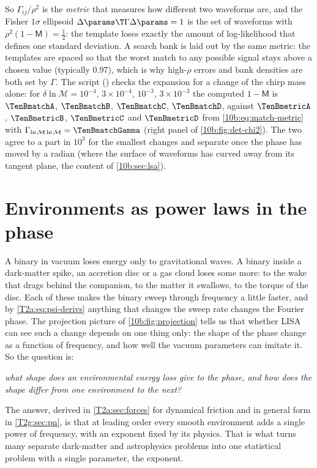 So $\Gamma_{ij}/\rho^2$ is the \emph{metric} that measures how different two waveforms are, and the Fisher
$1\sigma$ ellipsoid $\Delta\params\T\Gamma\Delta\params=1$ is the set of waveforms with $\rho^2(1-\mathsf M)=\tfrac12$: the
template loses exactly the amount of log-likelihood that defines one standard deviation. A search bank is laid out
by the same metric: the templates are spaced so that the worst match to any possible signal stays above a chosen value
(typically $0.97$), which is why high-$\rho$ errors and bank densities are both set by $\Gamma$.
The script () checks the expansion for a change of the chirp mass alone: for
$\delta\ln\mathcal M=10^{-4}$, $3\times10^{-4}$, $10^{-3}$, $3\times10^{-3}$ the computed $1-\mathsf M$ is
$\TenBmatchA$, $\TenBmatchB$, $\TenBmatchC$, $\TenBmatchD$, against $\TenBmetricA$, $\TenBmetricB$, $\TenBmetricC$ and
$\TenBmetricD$ from \eqref{10b:eq:match-metric} with $\Gamma_{\ln\mathcal M\ln\mathcal M}=\TenBmatchGamma$ (right panel of
\cref{10b:fig:det-chi2}). The two agree to a part in $10^{3}$ for the smallest changes and separate once the phase
has moved by a radian (where the surface of waveforms has curved away from its tangent plane, the content of
\cref{10b:sec:lsa}).
\section{Environments as power laws in the phase}
\label{10b:sec:env}

A binary in vacuum loses energy only to gravitational waves. A binary inside a dark-matter spike, an accretion
disc or a gas cloud loses some more: to the wake that drags behind the companion, to the matter it swallows, to the
torque of the disc. Each of these makes the binary sweep through frequency a little faster, and by
\cref{T2a:eq:psi-derivs} anything that changes the sweep rate changes the Fourier phase. The projection picture of
\cref{10b:fig:projection} tells us that whether LISA can see such a change depends on one thing only: the shape of
the phase change as a function of frequency, and how well the vacuum parameters can imitate it. So the question is:
\begin{center}
\emph{what shape does an environmental energy loss give to the phase, and how does the shape differ from one
environment to the next?}
\end{center}
The answer, derived in \cref{T2a:sec:forces} for dynamical friction and in general form in \cref{T2g:sec:pn}, is that at
leading order every smooth environment adds a single power of frequency, with an exponent fixed by its physics. That
is what turns many separate dark-matter and astrophysics problems into one statistical problem with a single
parameter, the exponent.

